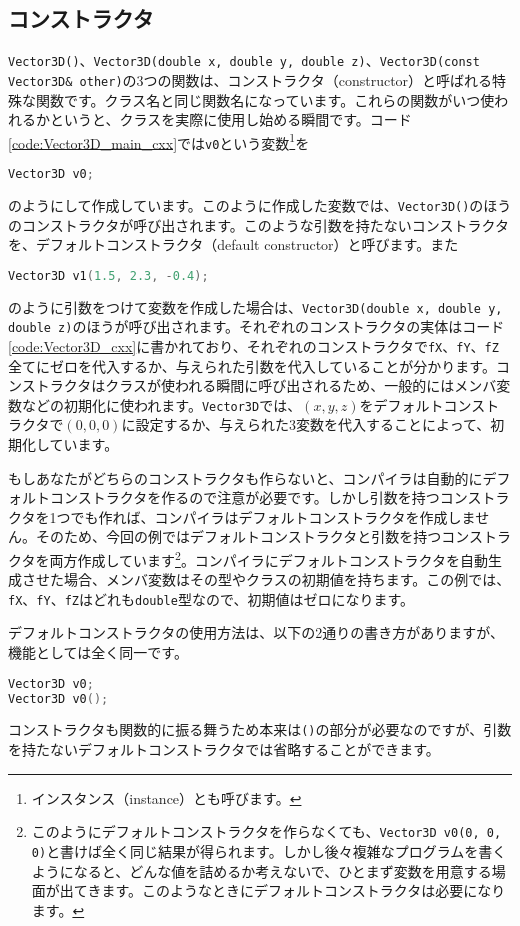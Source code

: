 \subsection{コンストラクタ}
\texttt{Vector3D()}、\texttt{Vector3D(double x, double y, double z)}、\texttt{Vector3D(const Vector3D\& other)}の3つの関数は、コンストラクタ（constructor）と呼ばれる特殊な関数です。クラス名と同じ関数名になっています。これらの関数がいつ使われるかというと、クラスを実際に使用し始める瞬間です。コード\ref{code:Vector3D_main_cxx}では\texttt{v0}という変数\footnote{インスタンス（instance）とも呼びます。}を
\begin{lstlisting}[language=c++]
  Vector3D v0;
\end{lstlisting}
のようにして作成しています。このように作成した変数では、\texttt{Vector3D()}のほうのコンストラクタが呼び出されます。このような引数を持たないコンストラクタを、デフォルトコンストラクタ（default constructor）と呼びます。また
\begin{lstlisting}[language=c++]
  Vector3D v1(1.5, 2.3, -0.4);
\end{lstlisting}
のように引数をつけて変数を作成した場合は、\texttt{Vector3D(double x, double y, double z)}のほうが呼び出されます。それぞれのコンストラクタの実体はコード\ref{code:Vector3D_cxx}に書かれており、それぞれのコンストラクタで\texttt{fX}、\texttt{fY}、\texttt{fZ}全てにゼロを代入するか、与えられた引数を代入していることが分かります。コンストラクタはクラスが使われる瞬間に呼び出されるため、一般的にはメンバ変数などの初期化に使われます。\texttt{Vector3D}では、$(x, y, z)$をデフォルトコンストラクタで$(0, 0, 0)$に設定するか、与えられた3変数を代入することによって、初期化しています。

もしあなたがどちらのコンストラクタも作らないと、コンパイラは自動的にデフォルトコンストラクタを作るので注意が必要です。しかし引数を持つコンストラクタを1つでも作れば、コンパイラはデフォルトコンストラクタを作成しません。そのため、今回の例ではデフォルトコンストラクタと引数を持つコンストラクタを両方作成しています\footnote{このようにデフォルトコンストラクタを作らなくても、\texttt{Vector3D v0(0, 0, 0)}と書けば全く同じ結果が得られます。しかし後々複雑なプログラムを書くようになると、どんな値を詰めるか考えないで、ひとまず変数を用意する場面が出てきます。このようなときにデフォルトコンストラクタは必要になります。}。コンパイラにデフォルトコンストラクタを自動生成させた場合、メンバ変数はその型やクラスの初期値を持ちます。この例では、\texttt{fX}、\texttt{fY}、\texttt{fZ}はどれも\texttt{double}型なので、初期値はゼロになります。

デフォルトコンストラクタの使用方法は、以下の2通りの書き方がありますが、機能としては全く同一です。
\begin{lstlisting}[language=c++]
Vector3D v0;
Vector3D v0();
\end{lstlisting}
コンストラクタも関数的に振る舞うため本来は\texttt{()}の部分が必要なのですが、引数を持たないデフォルトコンストラクタでは省略することができます。

